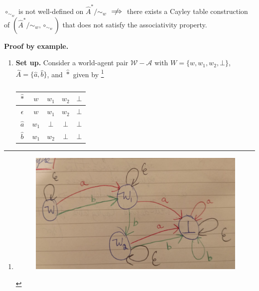 \begin{propositionE}\label{prp:circ_sim_w_not_well_defined_does_not_mean_no_associativity}
    $\circ_{\sim_{w}}$ is not well-defined on $\hat{A}^{*}/\sim_{w}$ $\centernot\implies$ there exists a Cayley table construction of $(\hat{A}^{*}/\sim_{w}, \circ_{\sim_{w}})$ that does not satisfy the associativity property.
\end{propositionE}
\begin{proofE}
\textbf{Proof by example.}
\begin{enumerate}
    \item \textbf{Set up.}
    Consider a world-agent pair $\mathscr{W}-\mathscr{A}$ with $W = \{ w, w_{1}, w_{2}, \bot \}$, $\hat{A} = \{\hat{a}, \hat{b}\}$, and $\hat{\ast}$ given by
    \footnote{\begin{figure}[H]
        \includegraphics[width=0.5\linewidth]{6BeyondSBDRLLocalAlgebras/Images/circ_sim_w_not_well_defined_does_not_mean_no_associativity_counter_example.jpeg}
        \caption{
        }
    \end{figure}}
    \begin{table}[H]
        \centering
        \begin{tabular}{c|cccc}
            $\hat{\ast}$   & $w$       & $w_{1}$   & $w_{2}$   & $\bot$ \\
            \hline
            $\epsilon$      & $w$       & $w_{1}$   & $w_{2}$   & $\bot$ \\
            $\hat{a}$       & $w_{1}$   & $\bot$   & $\bot$   & $\bot$ \\
            $\hat{b}$       & $w_{1}$   & $w_{2}$   & $\bot$   & $\bot$
        \end{tabular}
        \caption{
        }
    \end{table}


\end{enumerate}
\end{proofE}
